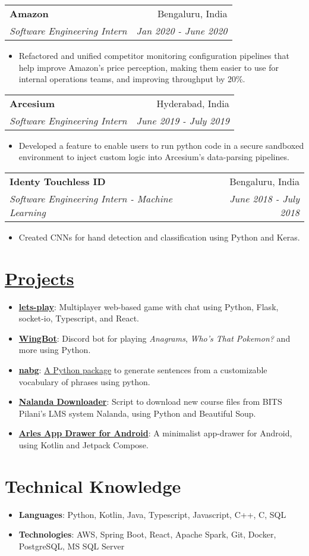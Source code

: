 \documentclass[a4paper,11pt]{article}
\makeatletter
\newcommand{\resumeItem}[2]{
  \item\small{
    \textbf{#1}{: #2 \vspace{-1pt}}
  }
}
\newcommand{\resumeItemNoTitle}[1]{
  \item\small{
    {#1 \vspace{-1pt}}
  }
}
\newcommand{\resumeSubheading}[4]{
  \vspace{8pt}
    \begin{tabular*}{0.97\textwidth}{l@{\extracolsep{\fill}}r}
      \textbf{#1} & #2 \\
      \textit{\small#3} & \textit{\small #4} \\
    \end{tabular*}\vspace{-1pt}
}
\newcommand{\resumeItemListStart}{\begin{itemize}}
\newcommand{\resumeItemListEnd}{\end{itemize}\vspace{-2pt}}
\makeatother
\begin{document}
\resumeSubheading
{Amazon}{Bengaluru, India}
{Software Engineering Intern}{Jan 2020 - June 2020}
\resumeItemListStart
\resumeItemNoTitle{Refactored and unified competitor monitoring configuration pipelines that help improve Amazon's price perception, making them easier to use for internal operations teams, and improving throughput by 20\%.}
\resumeItemListEnd

\resumeSubheading
{Arcesium}{Hyderabad, India}
{Software Engineering Intern}{June 2019 - July 2019}
\resumeItemListStart
\resumeItemNoTitle{Developed a feature to enable users to run python code in a secure sandboxed environment to inject custom logic into Arcesium's data-parsing pipelines.}
\resumeItemListEnd

\resumeSubheading
{Identy Touchless ID}{Bengaluru, India}
{Software Engineering Intern - Machine Learning}{June 2018 - July 2018}
\resumeItemListStart
\resumeItemNoTitle{Created CNNs for hand detection and classification using Python and Keras.}
\resumeItemListEnd


\section{\href{https://naveen-u.github.io/projects/}{Projects}}
\resumeItemListStart
\resumeItem{\href{https://github.com/naveen-u/lets-play}{lets-play}}
{Multiplayer web-based game with chat using Python, Flask, socket-io, Typescript, and React.}
\resumeItem{\href{https://github.com/naveen-u/WingBot}{WingBot}}
{Discord bot for playing \textit{Anagrams}, \textit{Who's That Pokemon?} and more using Python.}
\resumeItem{\href{https://github.com/naveen-u/nabg}{nabg}}
{\href{https://pypi.org/project/nabg/}{A Python package} to generate sentences from a customizable vocabulary of phrases using python.}
\resumeItem{\href{https://github.com/naveen-u/Nalanda-Downloader}{Nalanda Downloader}}
{Script to download new course files from BITS Pilani's LMS system Nalanda, using Python and Beautiful Soup.}
\resumeItem{\href{https://github.com/naveen-u/arles-app-drawer}{Arles App Drawer for Android}}
{A minimalist app-drawer for Android, using Kotlin and Jetpack Compose.}
\resumeItemListEnd

\section{Technical Knowledge}
\resumeItemListStart
\resumeItem{Languages}{Python, Kotlin, Java, Typescript, Javascript, C++, C, SQL}
\resumeItem{Technologies}{AWS, Spring Boot, React, Apache Spark, Git, Docker, PostgreSQL, MS SQL Server}
\resumeItemListEnd
\end{document}
